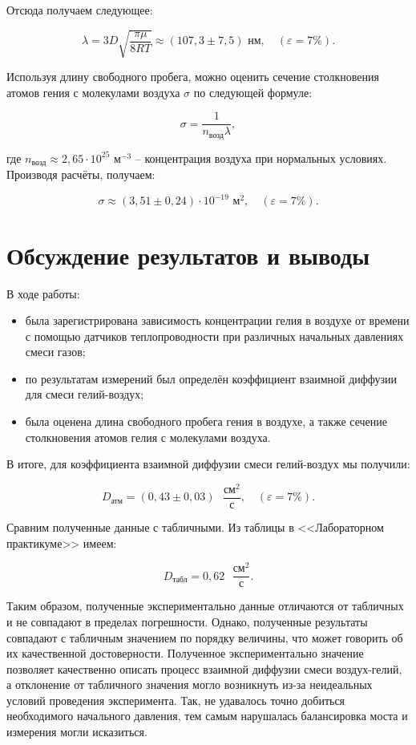 \documentclass[a4paper,12pt]{article} %
\begin{document}
Отсюда получаем следующее:

\[ \boxed{\lambda = 3D\sqrt{\dfrac{\pi\mu}{8RT}} \approx (107,3 \pm 7,5) \text{ нм}}, \quad (\varepsilon = 7\%).\]

Используя длину свободного пробега, можно оценить сечение столкновения атомов гения с молекулами воздуха $ \sigma $ по следующей формуле:

\[ \sigma = \frac{1}{n_\text{возд}\lambda}, \]

где $ n_\text{возд} \approx 2,65 \cdot 10^{25} $ м$ ^{-3} $ -- концентрация воздуха при нормальных условиях. Производя расчёты, получаем:

\[ \boxed{\sigma \approx (3,51 \pm 0,24) \cdot 10^{-19} \text{ м}^2}, \quad (\varepsilon = 7\%).\]

\section{Обсуждение результатов и выводы}

В ходе работы:

\begin{itemize}
	\item была зарегистрирована зависимость концентрации гелия в воздухе от времени с помощью датчиков теплопроводности при различных начальных давлениях смеси газов;
	\item по результатам измерений был определён коэффициент взаимной диффузии для смеси гелий-воздух;
	\item была оценена длина свободного пробега гения в воздухе, а также сечение столкновения атомов гелия с молекулами воздуха.
\end{itemize}

В итоге, для коэффициента взаимной диффузии смеси гелий-воздух мы получили:

\[ \boxed{D_\text{атм} = (0,43\pm0,03) \text{ } \frac{\text{см}^2}{\text{с}}}, \quad (\varepsilon = 7\%). \]

Сравним полученные данные с табличными. Из таблицы в <<Лабораторном практикуме>> имеем:

\[ D_\text{табл} = 0,62 \text{ } \frac{\text{см}^2}{\text{с}}. \]

Таким образом, полученные экспериментально данные отличаются от табличных и не совпадают в пределах погрешности. Однако, полученные результаты совпадают с табличным значением по порядку величины, что может говорить об их качественной достоверности. Полученное экспериментально значение позволяет качественно описать процесс взаимной диффузии смеси воздух-гелий, а отклонение от табличного значения могло возникнуть из-за неидеальных условий проведения эксперимента. Так, не удавалось точно добиться необходимого начального давления, тем самым нарушалась балансировка моста и измерения могли исказиться.
\end{document}
